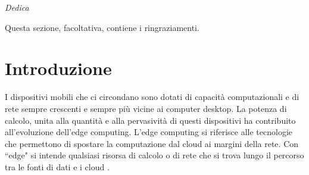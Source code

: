 \documentclass[12pt,italian]{report}
\begin{document}
\frontespizio
\beforepreface

% 
%

{\raggedleft \large \sl Dedica \\}
         
% 
%


%
%

Questa sezione, facoltativa, contiene i ringraziamenti.

%
%

\afterpreface

% 
% 

\chapter{Introduzione}
\label{cap:introduzione}
I dispositivi mobili che ci circondano sono dotati di capacità computazionali e di rete sempre crescenti e sempre più vicine ai computer desktop. La potenza di calcolo, unita alla quantità e alla pervasività di questi dispositivi ha contribuito all'evoluzione dell'edge computing. L'edge computing si riferisce alle tecnologie che permettono di spostare la computazione dal cloud ai 
margini della rete. Con ``edge" si intende qualsiasi risorsa di calcolo o di rete che si trova lungo il percorso tra le fonti di dati e i cloud \cite{edge-computing}.
\end{document}
